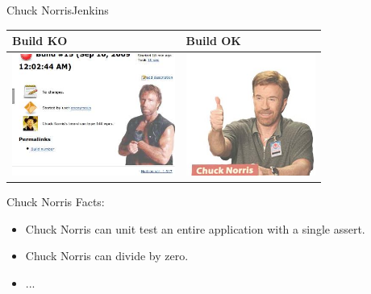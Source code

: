 \documentclass[9pt]{beamer}
\begin{document}
\begin{frame}{Chuck Norris}{Jenkins}
\begin{center}
\begin{tabular}{ l |l }
        Build KO & Build OK \\ \hline
        \includegraphics[height=4cm]{images/chuck_full} &
        \includegraphics[height=4cm]{images/chuck_happy}
        \\
\end{tabular}
\end{center}
Chuck Norris Facts:
\begin{itemize}
  \item Chuck Norris can unit test an entire application with a single assert.
  \item Chuck Norris can divide by zero.
  \item ...
\end{itemize}
\end{frame}
\end{document}
